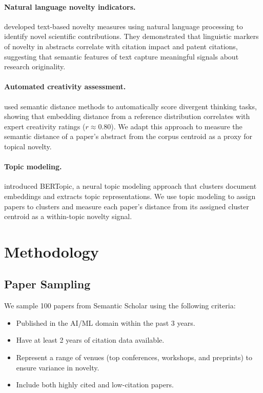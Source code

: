 \documentclass[11pt,a4paper]{article}
\begin{document}
\paragraph{Natural language novelty indicators.}
\citet{arts2020natural} developed text-based novelty measures using
natural language processing to identify novel scientific contributions.
They demonstrated that linguistic markers of novelty in abstracts
correlate with citation impact and patent citations, suggesting that
semantic features of text capture meaningful signals about research
originality.

\paragraph{Automated creativity assessment.}
\citet{beaty2021automating} used semantic distance methods to
automatically score divergent thinking tasks, showing that embedding
distance from a reference distribution correlates with expert creativity
ratings ($r \approx 0.80$).  We adapt this approach to measure the
semantic distance of a paper's abstract from the corpus centroid as a
proxy for topical novelty.

\paragraph{Topic modeling.}
\citet{grootendorst2022bertopic} introduced BERTopic, a neural topic
modeling approach that clusters document embeddings and extracts topic
representations.  We use topic modeling to assign papers to clusters and
measure each paper's distance from its assigned cluster centroid as a
within-topic novelty signal.

\section{Methodology}
\label{sec:methodology}

\subsection{Paper Sampling}
\label{sec:sampling}

We sample 100 papers from Semantic Scholar using the following criteria:

\begin{itemize}
  \item Published in the AI/ML domain within the past 3 years.
  \item Have at least 2 years of citation data available.
  \item Represent a range of venues (top conferences, workshops, and
        preprints) to ensure variance in novelty.
  \item Include both highly cited and low-citation papers.
\end{itemize}
\end{document}

